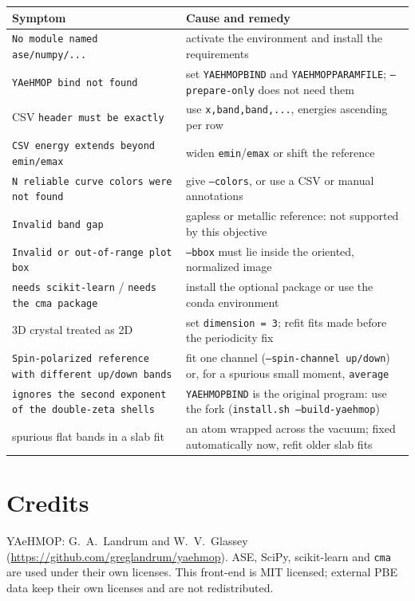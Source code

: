 \documentclass[11pt,a4paper]{article}
\newcommand{\cmd}[1]{\texttt{#1}}
\renewcommand{\_}{\origunderscore\allowbreak}
\begin{document}
\begin{center}
\small
\begin{tabularx}{\textwidth}{>{\raggedright\arraybackslash}p{4.6cm} L}
\toprule
Symptom & Cause and remedy \\
\midrule
\cmd{No module named ase/numpy/...} & activate the environment and install the requirements \\
\cmd{YAeHMOP bind not found} & set \cmd{YAEHMOP\_BIND} and \cmd{YAEHMOP\_PARAM\_FILE}; \cmd{--prepare-only} does not need them \\
CSV \cmd{header must be exactly} & use \cmd{x,band\_1,band\_2,...}, energies ascending per row \\
\cmd{CSV energy extends beyond emin/emax} & widen \cmd{emin}/\cmd{emax} or shift the reference \\
\cmd{N reliable curve colors were not found} & give \cmd{--colors}, or use a CSV or manual annotations \\
\cmd{Invalid band gap} & gapless or metallic reference: not supported by this objective \\
\cmd{Invalid or out-of-range plot box} & \cmd{--bbox} must lie inside the oriented, normalized image \\
\cmd{needs scikit-learn} / \cmd{needs the cma package} & install the optional package or use the conda environment \\
3D crystal treated as 2D & set \cmd{dimension = 3}; refit fits made before the periodicity fix \\
\cmd{Spin-polarized reference with different up/down bands} & fit one channel (\cmd{--spin-channel up/down}) or, for a spurious small moment, \cmd{average} \\
\cmd{ignores the second exponent of the double-zeta shells} & \cmd{YAEHMOP\_BIND} is the original program: use the fork (\cmd{install.sh --build-yaehmop}) \\
spurious flat bands in a slab fit & an atom wrapped across the vacuum; fixed automatically now, refit older slab fits \\
\bottomrule
\end{tabularx}
\end{center}

\section*{Credits}
YAeHMOP: G.~A.~Landrum and W.~V.~Glassey (\url{https://github.com/greglandrum/yaehmop}). ASE, SciPy,
scikit-learn and \cmd{cma} are used under their own licenses. This front-end is MIT licensed; external
PBE data keep their own licenses and are not redistributed.
\end{document}
